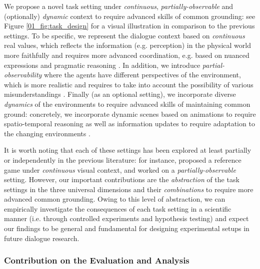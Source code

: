 We propose a novel task setting under \textit{continuous}, \textit{partially-observable} and (optionally) \textit{dynamic} context to require advanced skills of common grounding: see Figure \ref{01_fig:task_design} for a visual illustration in comparison to the previous settings. To be specific, we represent the dialogue context based on \textit{continuous} real values, which reflects the information (e.g. perception) in the physical world more faithfully and requires more advanced coordination, e.g. based on nuanced expressions \citep{paradis_2008} and pragmatic reasoning \citep{monroe2017colors}. In addition, we introduce \textit{partial-observability} where the agents have different perspectives of the environment, which is more realistic and requires to take into account the possibility of various misunderstandings \citep{keysar2000taking}. Finally (as an optional setting), we incorporate diverse \textit{dynamics} of the environments to require advanced skills of maintaining common ground: concretely, we incorporate dynamic scenes based on animations to require spatio-temporal reasoning \citep{girdhar2020cater} as well as information updates to require adaptation to the changing environments \citep{moon-etal-2020-situated}.

It is worth noting that each of these settings has been explored at least partially or independently in the previous literature: for instance, \citet{de2017guesswhat} proposed a reference game under \textit{continuous} visual context, and \citet{he2017learning} worked on a \textit{partially-observable} setting. However, our important contributions are the \textit{abstraction} of the task settings in the three universal dimensions and their \textit{combinations} to require more advanced common grounding. Owing to this level of abstraction, we can empirically investigate the consequences of each task setting in a scientific manner (i.e. through controlled experiments and hypothesis testing) and expect our findings to be general and fundamental for designing experimental setups in future dialogue research.


\subsubsection{Contribution on the Evaluation and Analysis}


